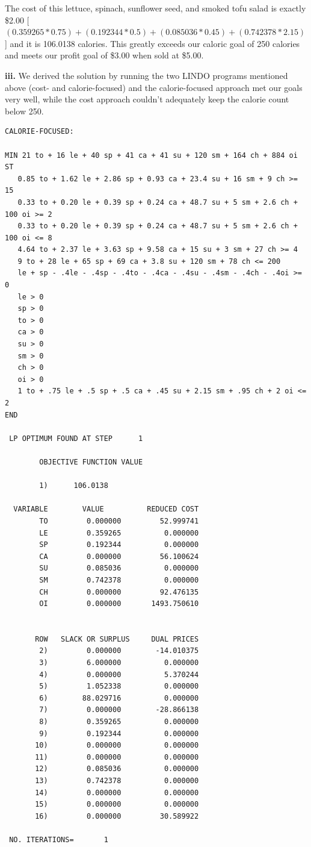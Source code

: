 \documentclass[paper=a4, fontsize=11pt]{scrartcl} %
\numberwithin{equation}{section} %
\numberwithin{figure}{section} %
\numberwithin{table}{section} %
\begin{document}
	The cost of this lettuce, spinach, sunflower seed, and smoked tofu salad is exactly \$2.00 [$(0.359265*0.75)+(0.192344*0.5)+(0.085036*0.45)+(0.742378*2.15)$] and it is 106.0138 calories. This greatly exceeds our caloric goal of 250 calories and meets our profit goal of \$3.00 when sold at \$5.00.\newline
    
    \textbf{iii.}\newline
    We derived the solution by running the two LINDO programs mentioned above (cost- and calorie-focused) and the calorie-focused approach met our goals very well, while the cost approach couldn't adequately keep the calorie count below 250.
    
    \begin{verbatim}
CALORIE-FOCUSED:

MIN 21 to + 16 le + 40 sp + 41 ca + 41 su + 120 sm + 164 ch + 884 oi
ST
   0.85 to + 1.62 le + 2.86 sp + 0.93 ca + 23.4 su + 16 sm + 9 ch >= 15
   0.33 to + 0.20 le + 0.39 sp + 0.24 ca + 48.7 su + 5 sm + 2.6 ch + 100 oi >= 2
   0.33 to + 0.20 le + 0.39 sp + 0.24 ca + 48.7 su + 5 sm + 2.6 ch + 100 oi <= 8
   4.64 to + 2.37 le + 3.63 sp + 9.58 ca + 15 su + 3 sm + 27 ch >= 4
   9 to + 28 le + 65 sp + 69 ca + 3.8 su + 120 sm + 78 ch <= 200
   le + sp - .4le - .4sp - .4to - .4ca - .4su - .4sm - .4ch - .4oi >= 0
   le > 0
   sp > 0
   to > 0
   ca > 0
   su > 0
   sm > 0
   ch > 0
   oi > 0
   1 to + .75 le + .5 sp + .5 ca + .45 su + 2.15 sm + .95 ch + 2 oi <= 2
END

 LP OPTIMUM FOUND AT STEP      1

        OBJECTIVE FUNCTION VALUE

        1)      106.0138

  VARIABLE        VALUE          REDUCED COST
        TO         0.000000         52.999741
        LE         0.359265          0.000000
        SP         0.192344          0.000000
        CA         0.000000         56.100624
        SU         0.085036          0.000000
        SM         0.742378          0.000000
        CH         0.000000         92.476135
        OI         0.000000       1493.750610


       ROW   SLACK OR SURPLUS     DUAL PRICES
        2)         0.000000        -14.010375
        3)         6.000000          0.000000
        4)         0.000000          5.370244
        5)         1.052338          0.000000
        6)        88.029716          0.000000
        7)         0.000000        -28.866138
        8)         0.359265          0.000000
        9)         0.192344          0.000000
       10)         0.000000          0.000000
       11)         0.000000          0.000000
       12)         0.085036          0.000000
       13)         0.742378          0.000000
       14)         0.000000          0.000000
       15)         0.000000          0.000000
       16)         0.000000         30.589922

 NO. ITERATIONS=       1

    \end{verbatim}
    
\end{document}
